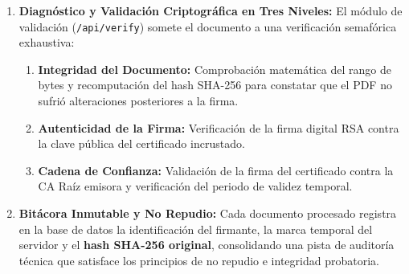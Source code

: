 \begin{enumerate}
  \item \textbf{Diagnóstico y Validación Criptográfica en Tres Niveles:} El módulo de validación (\texttt{/api/verify}) somete el documento a una verificación semafórica exhaustiva:
  \begin{enumerate}[label=\alph*)]
    \item \textbf{Integridad del Documento:} Comprobación matemática del rango de bytes y recomputación del hash SHA-256 para constatar que el PDF no sufrió alteraciones posteriores a la firma.
    \item \textbf{Autenticidad de la Firma:} Verificación de la firma digital RSA contra la clave pública del certificado incrustado.
    \item \textbf{Cadena de Confianza:} Validación de la firma del certificado contra la CA Raíz emisora y verificación del periodo de validez temporal.
  \end{enumerate}
  
  \item \textbf{Bitácora Inmutable y No Repudio:} Cada documento procesado registra en la base de datos la identificación del firmante, la marca temporal del servidor y el \textbf{hash SHA-256 original}, consolidando una pista de auditoría técnica que satisface los principios de no repudio e integridad probatoria.
\end{enumerate}
